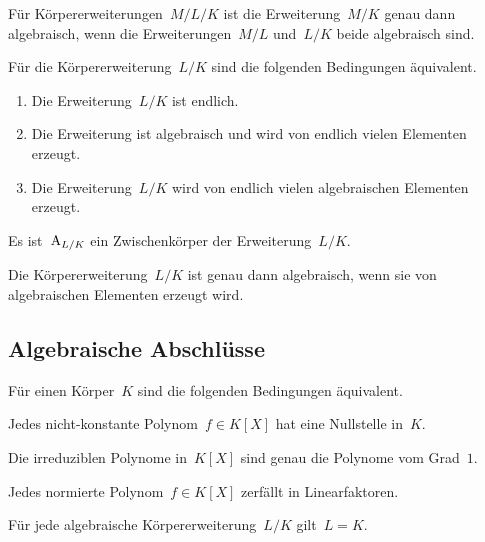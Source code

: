 \begin{proposition}
  Für Körpererweiterungen~$M/L/K$ ist die Erweiterung~$M/K$ genau dann algebraisch, wenn die Erweiterungen~$M/L$ und~$L/K$ beide algebraisch sind.
\end{proposition}

\begin{proposition}
  Für die Körpererweiterung~$L/K$ sind die folgenden Bedingungen äquivalent.
  \begin{enumerate}
    \item
      Die Erweiterung~$L/K$ ist endlich.
    \item
      Die Erweiterung ist algebraisch und wird von endlich vielen Elementen erzeugt.
    \item
      Die Erweiterung~$L/K$ wird von endlich vielen algebraischen Elementen erzeugt.
  \end{enumerate}
\end{proposition}

\begin{corollary}
  Es ist~$\operatorname{A}_{L/K}$ ein Zwischenkörper der Erweiterung~$L/K$.
\end{corollary}

\begin{corollary}
  Die Körpererweiterung~$L/K$ ist genau dann algebraisch, wenn sie von algebraischen Elementen erzeugt wird.
\end{corollary}



\subsection{Algebraische Abschlüsse}

\begin{proposition}
  \label{characterizations of algebraically closed field}
  Für einen Körper~$K$ sind die folgenden Bedingungen äquivalent.
  \begin{equivlist}
    \item
      Jedes nicht-konstante Polynom~$f \in K[X]$ hat eine Nullstelle in~$K$.
    \item
      Die irreduziblen Polynome in~$K[X]$ sind genau die Polynome vom Grad~$1$.
    \item
      Jedes normierte Polynom~$f \in K[X]$ zerfällt in Linearfaktoren.
    \item
      Für jede algebraische Körpererweiterung~$L/K$ gilt~$L = K$.
  \end{equivlist}
\end{proposition}

